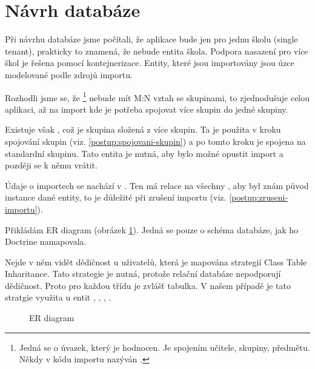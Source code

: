 \section{Návrh databáze}

Při návrhu databáze jsme počítali, že aplikace bude jen pro jednu školu (single tenant), prakticky to znamená, že nebude entita škola. 
  Podpora nasazení pro více škol je řešena pomocí kontejnerizace.
Entity, které jsou importovány jsou úzce modelované podle zdrojů importu.

Rozhodli jsme se, že \footnote{Jedná se o úvazek, který je hodnocen. Je spojením učitele, skupiny, předmětu. Někdy v kódu importu nazýván .} 
nebude mít M:N vztah se skupinami, to zjednodušuje celou aplikaci, až na import kde je potřeba spojovat více skupin do jedné skupiny.

Existuje však , což je skupina složená z více skupin. Ta je použita v kroku spojování skupin (viz. \ref{postup:spojovani-skupin}) a po tomto kroku je spojena na standardní skupinu.
Tato entita je nutná, aby bylo možné opustit import a později se k němu vrátit.

Údaje o importech se nachází v . Ten má relace na všechny , aby byl znám původ instance dané entity, to je důležité při zrušení importu (viz. \ref{postup:zruseni-importu}).

Přikládám ER diagram (obrázek \ref{postup:er-diagram}). Jedná se pouze o schéma databáze, jak ho Doctrine namapovala.

Nejde v něm vidět dědičnost u uživatelů, která je mapována strategií Class Table Inharitance. Tato strategie je nutná, protože relační databáze nepodporují dědičnost. Proto pro každou třídu je zvlášť tabulka.\cite{P-of-EAA}
V našem případě je tato stratgie využita u entit , , , . 


%
%
%




\begin{figure}
	\centering
  \resizebox{0.95\textwidth}{!}{\huge{}}
  \caption{ER diagram}
  \label{postup:er-diagram}
\end{figure}



